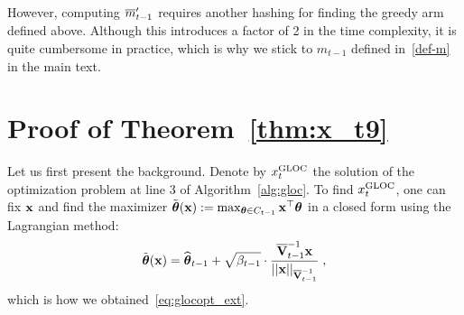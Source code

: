 However, computing $\overline{m}'_{t-1}$ requires another hashing for finding the greedy arm defined above. 
Although this introduces a factor of 2 in the time complexity, it is quite cumbersome in practice, which is why we stick to $m_{t-1}$ defined in~\eqref{def-m} in the main text.

\vspace{-5pt}
\section{Proof of Theorem~\ref{thm:x_t9}}
\vspace{-5pt}
\label{sec:proof-thm-x_t9}

Let us first present the background.
Denote by $x^{\text{\normalfont GLOC}}_t$ the solution of the optimization problem at line 3 of Algorithm~\ref{alg:gloc}.
To find $x^{\text{\normalfont GLOC}}_t$, one can fix $\mathbf{x}$ and find the maximizer $\tilde{\boldsymbol\theta}(\mathbf{x}) := \max_{{{\boldsymbol \theta}}\in C_{t-1}} \mathbf{x}^{\top}{{\boldsymbol \theta}}$ in a closed form using the Lagrangian method:
\begin{align} \label{eq:glocopt_tilth}
  \tilth(\x) = \hatth_{t-1} + \sqrt{\beta_{t-1}} \cdot\fr{ \barV^{-1}_{t-1} \x }{ ||\x||_{\barV^{-1}_{t-1}} } \;,
\end{align}
which is how we obtained~\eqref{eq:glocopt_ext}.

